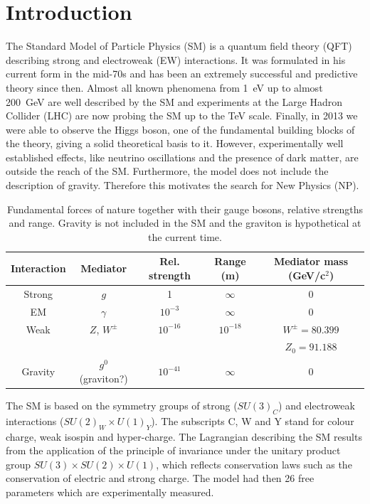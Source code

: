 \chapter{Introduction}
\label{sec:Introduction}

The Standard Model of Particle Physics (SM) is a quantum field theory (QFT) describing strong and electroweak (EW) interactions.
It was formulated in his current form in the mid-70s and has been an extremely successful and predictive theory since then.
Almost all known phenomena from 1~eV up to almost 200~GeV are well described by the SM and experiments at the Large Hadron
Collider (LHC) are now probing the SM up to the TeV scale.
Finally, in 2013 we were able to observe the Higgs boson, one of the fundamental building blocks of the theory,
giving a solid theoretical basis to it. However, experimentally well established effects, like neutrino
oscillations and the presence of dark matter, are outside the reach of the SM. Furthermore, the model does not include
the description of gravity. Therefore this motivates the search for New Physics (NP).

\begin{table}[h!]
\begin{tabular}{|c|c|c|c|c|}
Interaction	& Mediator	& Rel. strength	& Range	(m)	& Mediator mass (GeV/c${}^2$) \\
\hline
Strong		& $g$		& 1			& $\infty$		& 0		\\
EM			& $\gamma$	& $10^{-3}$		& $\infty$ 		& 0		\\
Weak		& $Z$, $W^\pm$	& $10^{-16}$		& $10^{-18}$	& $W^\pm = 80.399$ \\
			&		&			&		& $Z_0 = 91.188$	\\
Gravity		& $g^0$ (graviton?) & $10^{-41}$	& $\infty$		& 0		\\
\end{tabular}
\caption{Fundamental forces of nature together with their gauge bosons, relative strengths and range.
Gravity is not included in the SM and the graviton is hypothetical at the current time.}
\label{tab:interactions}
\end{table}

The SM is based on the symmetry groups of strong ($SU(3)_C$) and electroweak interactions ($SU(2)_W \times U(1)_Y$).
The subscripts C, W and Y stand for colour charge, weak isospin and hyper-charge. The Lagrangian describing the
SM results from the application of the principle of invariance under the unitary product group $SU(3) \times SU(2) \times U(1)$,
which reflects conservation laws such as the conservation of electric and strong charge.
The model had then 26 free parameters which are experimentally measured.

